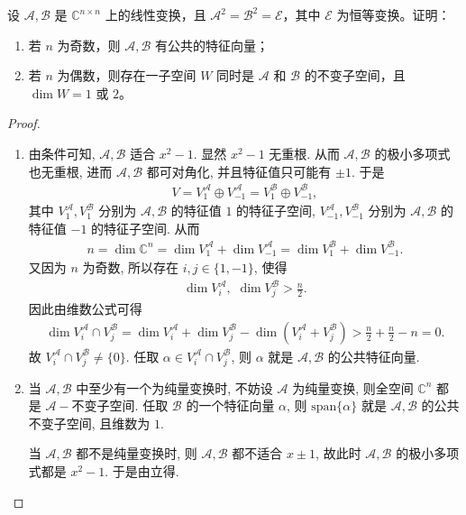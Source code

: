\documentclass[../../main.tex]{subfiles}
\begin{document}
\begin{example}
设 \( \mathscr{A},\mathscr{B} \) 是 \( \mathbb{C}^{n \times n} \) 上的线性变换，且 \( \mathscr{A}^2 = \mathscr{B}^2 = \mathscr{E} \)，其中 \( \mathscr{E} \) 为恒等变换。证明：
\begin{enumerate}[(1)]
\item 若 \( n \) 为奇数，则 \( \mathscr{A},\mathscr{B} \) 有公共的特征向量；

\item 若 \( n \) 为偶数，则存在一子空间 \( W \) 同时是 \( \mathscr{A} \) 和 \( \mathscr{B} \) 的不变子空间，且 \( \dim W = 1 \) 或 \( 2 \)。
\end{enumerate}
\end{example}
\begin{proof}
\begin{enumerate}[(1)]
\item 由条件可知, $\mathscr{A},\mathscr{B}$ 适合 $x^2-1$. 显然 $x^2-1$ 无重根. 从而 $\mathscr{A},\mathscr{B}$ 的极小多项式也无重根,
进而 $\mathscr{A},\mathscr{B}$ 都可对角化, 并且特征值只可能有 $\pm 1$. 于是
\begin{align*}
V=V_{1}^{\mathscr{A}}\oplus V_{-1}^{\mathscr{A}}=V_{1}^{\mathscr{B}}\oplus V_{-1}^{\mathscr{B}},
\end{align*}
其中 $V_{1}^{\mathscr{A}},V_{1}^{\mathscr{B}}$ 分别为 $\mathscr{A},\mathscr{B}$ 的特征值 $1$ 的特征子空间, $V_{-1}^{\mathscr{A}},V_{-1}^{\mathscr{B}}$ 分别为 $\mathscr{A},\mathscr{B}$ 的特征值 $-1$ 的特征子空间. 从而
\begin{align*}
n=\dim\mathbb{C} ^n=\dim V_{1}^{\mathscr{A}}+\dim V_{-1}^{\mathscr{A}}=\dim V_{1}^{\mathscr{B}}+\dim V_{-1}^{\mathscr{B}}.
\end{align*}
又因为 $n$ 为奇数, 所以存在 $i,j\in \{ 1,-1 \}$, 使得
\begin{align*}
\dim V_{i}^{\mathscr{A}},\,\,\dim V_{j}^{\mathscr{B}}>\frac{n}{2}.
\end{align*}
因此由维数公式可得
\begin{align*}
\dim V_{i}^{\mathscr{A}}\cap V_{j}^{\mathscr{B}}=\dim V_{i}^{\mathscr{A}}+\dim V_{j}^{\mathscr{B}}-\dim\left( V_{i}^{\mathscr{A}}+V_{j}^{\mathscr{B}} \right) >\frac{n}{2}+\frac{n}{2}-n=0.
\end{align*}
故 $V_{i}^{\mathscr{A}}\cap V_{j}^{\mathscr{B}}\ne \{ 0 \}$. 任取 $\alpha \in V_{i}^{\mathscr{A}}\cap V_{j}^{\mathscr{B}}$, 则 $\alpha$ 就是 $\mathscr{A},\mathscr{B}$ 的公共特征向量.

\item 当 $\mathscr{A},\mathscr{B}$ 中至少有一个为纯量变换时, 不妨设 $\mathscr{A}$ 为纯量变换, 则全空间 $\mathbb{C} ^n$ 都是 $\mathscr{A}-$不变子空间. 任取 $\mathscr{B}$ 的一个特征向量 $\alpha$, 则 $\mathrm{span}\{ \alpha \}$ 就是 $\mathscr{A},\mathscr{B}$ 的公共不变子空间, 且维数为 $1$.

当 $\mathscr{A},\mathscr{B}$ 都不是纯量变换时, 则 $\mathscr{A},\mathscr{B}$ 都不适合 $x\pm 1$, 故此时 $\mathscr{A},\mathscr{B}$ 的极小多项式都是 $x^2-1$. 于是由立得.
\end{enumerate}
\end{proof}
\end{document}
